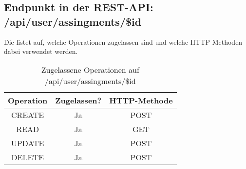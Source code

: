\subsection{Endpunkt in der REST-API: /api/user/assingments/\$id}
Die  listet auf, welche Operationen zugelassen sind und welche HTTP-Methoden dabei verwendet werden. 

\begin{table}[!htbp]
	\begin{tabular}{|c|c|c|}
		\hline
			\textbf{Operation} & \textbf{Zugelassen?} & \textbf{HTTP-Methode} \\ \hline
			CREATE & Ja & POST \\ \hline 
			READ & Ja & GET \\ \hline
			UPDATE & Ja & POST \\ \hline 
			DELETE & Ja & POST \\ \hline
	\end{tabular}

		\caption{Zugelassene Operationen auf /api/user/assingments/\$id}
		\label{tab:end:rest:api:user:assingments:id:meth}
\end{table}